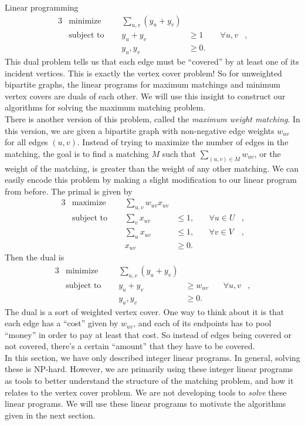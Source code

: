 \documentclass[11pt]{article}
\renewcommand{\'}{^{'}}
\begin{document}
\begin{section}{Linear programming}
	\begin{alignat}{3}
		& \text{minimize } & \sum_{u,v} (y_u + y_v)& \\
		& \text{subject to } \quad & y_u + y_v & \geq 1 & \quad \forall u,v &, \\
				    && y_u,y_v & \geq 0.
	\end{alignat}
	This dual problem tells us that each edge must be ``covered'' by at least one of its incident 
	vertices. This is exactly the vertex cover problem! So for unweighted bipartite graphs, the 
	linear programs for maximum matchings and minimum vertex covers are duals of each other. 
	We will use this insight to construct our algorithms for solving the maximum matching problem. 
	\\
	There is another version of this problem, called the \emph{maximum weight matching}. In this 
	version, we are given a bipartite graph with non-negative edge weights $w_{uv}$ for all 
	edges $(u,v)$. Instead of trying to maximize the number of edges in the matching, the goal 
	is to find a matching $M$ such that $\sum_{(u,v) \in M} w_{uv}$, or the weight of the matching, 
	is greater than the weight of any other matching. We can easily encode this problem by making 
	a slight modification to our linear program from before. The primal is given by
	\begin{alignat}{3}
		& \text{maximize } & \sum_{u,v} w_{uv}x_{uv}& \\
		& \text{subject to } \quad & \sum_{v} x_{uv} & \leq 1, & \quad \forall u\in U&, \\
				     &\quad & \sum_{u} x_{uv} & \leq 1, & \quad \forall v\in V &, \\
				&& x_{uv} & \geq 0.
	\end{alignat}
	Then the dual is
	\begin{alignat}{3}
		& \text{minimize } & \sum_{u,v} (y_u + y_v)& \\
		& \text{subject to } \quad & y_u + y_v & \geq w_{uv} & \quad \forall u,v &, \\
				    && y_u,y_v & \geq 0.
	\end{alignat}
	The dual is a sort of weighted vertex cover. One way to think about it is that each edge 
	has a ``cost'' given by $w_{uv}$, and each of its endpoints has to pool ``money'' in order 
	to pay at least that cost. So instead of edges being covered or not covered, there's a certain 
	``amount'' that they have to be covered.\\
	In this section, we have only described integer linear programs. In general, solving these 
	is NP-hard. However, we are primarily using these integer linear programs as tools to better 
	understand the structure of the matching problem, and how it relates to the vertex cover 
	problem. We are not developing tools to \emph{solve} these linear programs.
	We will use these linear programs to motivate the algorithms given in the next section. 
\end{section}
\end{document}
